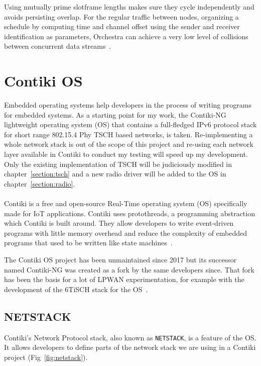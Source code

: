 Using mutually prime slotframe lengths
makes sure they cycle independently and avoids persisting overlap.
For the regular traffic between nodes, organizing a schedule by computing time
and channel offset using the sender and receiver
identification as parameters, Orchestra can achieve a very low level of
collisions between concurrent data streams~\cite{duquennoy2015}.

\section{Contiki OS}

Embedded operating systems help developers in the process of writing programs
for embedded systems.
As a starting point for my work, the Contiki-NG lightweight operating system (OS)
that contains a full-fledged IPv6 protocol stack for short range 802.15.4 Phy
TSCH based networks, is taken.
Re-implementing a whole network stack is out of the scope of this project and
re-using each network layer available in Contiki to conduct my testing will
speed up my development.
Only the existing implementation of TSCH will be judiciously modified in
chapter~\ref{section:tsch} and a new radio driver will be added to
the OS in chapter~\ref{section:radio}.

\paragraph{}

Contiki is a free and open-source Real-Time operating system (OS) specifically made
for IoT applications.
Contiki uses protothreads, a programming abstraction which Contiki is
built around.
They allow developers to write event-driven programs with little memory overhead and
reduce the complexity of embedded programs that used to be written
like state machines~\cite{10.1145/1182807.1182811}.

The Contiki OS project has been unmaintained since 2017 but its
successor named Contiki-NG was created as a fork by the same developers since.
That fork has been the basis for a lot of LPWAN experimentation, for example
with the development of the 6TiSCH stack for the OS~\cite{Duquennoy2017TSCHA6}.

\subsection{NETSTACK}

Contiki's Network Protocol stack, also known as \lstinline{NETSTACK}, is a
feature of the OS.
It allows developers to define parts of the network stack we are using in a Contiki
project (Fig~\ref{fig:netstack}).

